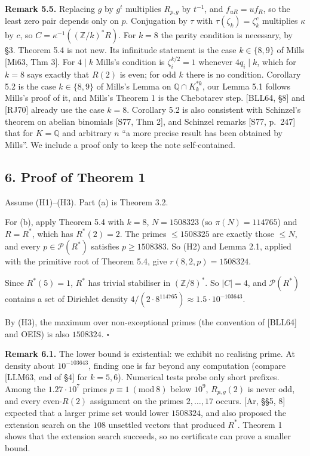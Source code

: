 \documentclass[
]{amsart}
\begin{document}
\textbf{Remark 5.5.} Replacing \(g\) by \(g^t\) multiplies \(R_{p,g}\)
by \(t^{-1}\), and \(f_{uR}=uf_R\), so the least zero pair depends only
on \(p\). Conjugation by \(\tau\) with \(\tau(\zeta_k)=\zeta_k^c\)
multiplies \(\kappa\) by \(c\), so \(C=\kappa^{-1}((\mathbb{Z}/k)^*R)\).
For \(k=8\) the parity condition is necessary, by §3. Theorem 5.4 is not
new. Its infinitude statement is the case \(k\in\{8,9\}\) of Mills
{[}Mi63, Thm 3{]}. For \(4\mid k\) Mills's condition is
\(\zeta_i^{k/2}=1\) whenever \(4q_i\mid k\), which for \(k=8\) says
exactly that \(R(2)\) is even; for odd \(k\) there is no condition.
Corollary 5.2 is the case \(k\in\{8,9\}\) of Mills's Lemma on
\(\mathbb{Q}\cap K_k^{*k}\), our Lemma 5.1 follows Mills's proof of it,
and Mills's Theorem 1 is the Chebotarev step. {[}BLL64, §8{]} and
{[}RJ70{]} already use the case \(k=8\). Corollary 5.2 is also
consistent with Schinzel's theorem on abelian binomials {[}S77, Thm
2{]}, and Schinzel remarks {[}S77, p.~247{]} that for \(K=\mathbb{Q}\)
and arbitrary \(n\) ``a more precise result has been obtained by
Mills''. We include a proof only to keep the note self-contained.

\hypertarget{proof-of-theorem-1}{%
\subsection{6. Proof of Theorem 1}\label{proof-of-theorem-1}}

Assume (H1)--(H3). Part (a) is Theorem 3.2.

For (b), apply Theorem 5.4 with \(k=8\), \(N=1508323\) (so
\(\pi(N)=114765\)) and \(R=R^*\), which has \(R^*(2)=2\). The primes
\(\le1508325\) are exactly those \(\le N\), and every
\(p\in\mathcal{P}(R^*)\) satisfies \(p\ge1508383\). So (H2) and Lemma
2.1, applied with the primitive root of Theorem 5.4, give
\(r(8,2,p)=1508324\).

Since \(R^*(5)=1\), \(R^*\) has trivial stabiliser in
\((\mathbb{Z}/8)^*\). So \(|C|=4\), and \(\mathcal{P}(R^*)\) contains a
set of Dirichlet density
\(4/(2\cdot8^{114765})\approx1.5\cdot10^{-103643}\).

By (H3), the maximum over non-exceptional primes (the convention of
{[}BLL64{]} and OEIS) is also \(1508324\). \(\square\)

\textbf{Remark 6.1.} The lower bound is existential: we exhibit no
realising prime. At density about \(10^{-103643}\), finding one is far
beyond any computation (compare {[}LLM63, end of §4{]} for \(k=5,6\)).
Numerical tests probe only short prefixes. Among the \(1.27\cdot10^7\)
primes \(p\equiv1\ (\mathrm{mod}\ 8)\) below \(10^9\), \(R_{p,g}(2)\) is
never odd, and every even-\(R(2)\) assignment on the primes
\(2,\dots,17\) occurs. {[}Ar, §§5, 8{]} expected that a larger prime set
would lower \(1508324\), and also proposed the extension search on the
\(108\) unsettled vectors that produced \(R^*\). Theorem 1 shows that
the extension search succeeds, so no certificate can prove a smaller
bound.
\end{document}
